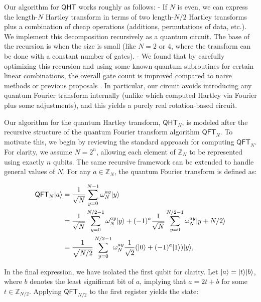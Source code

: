 \documentclass[12pt]{report}
\newcommand{\qht}{\mathsf{QHT}}
\newcommand{\qft}{\mathsf{QFT}}
\begin{document}
Our algorithm for $\qht$ works roughly as follows:
- If $N$ is even, we can express the length-$N$ Hartley transform in terms of two length-$N/2$ Hartley transforms plus a combination of cheap operations (additions, permutations of data, etc.). We implement this decomposition recursively as a quantum circuit. The base of the recursion is when the size is small (like $N=2$ or $4$, where the transform can be done with a constant number of gates).
- We found that by carefully optimizing this recursion and using some known quantum subroutines for certain linear combinations, the overall gate count is improved compared to naive methods or previous proposals \cite{Klappenecker2001DCT,Klappenecker2001Signal}. In particular, our circuit avoids introducing any quantum Fourier transform internally (unlike \cite{Klappenecker2001Signal} which computed Hartley via Fourier plus some adjustments), and this yields a purely real rotation-based circuit.



Our algorithm for the quantum Hartley transform, \( \qht_N \), is modeled after the recursive structure of the quantum Fourier transform algorithm \( \qft_N \). To motivate this, we begin by reviewing the standard approach for computing \( \qft_N \). For clarity, we assume \( N = 2^n \), allowing each element of \( \mathbb{Z}_N \) to be represented using exactly \( n \) qubits. The same recursive framework can be extended to handle general values of \( N \). For any \( a \in \mathbb{Z}_N \), the quantum Fourier transform is defined as:


\begin{align}
    \qft_N\ket{a}
    & = \frac{1}{\sqrt{N}} \sum_{y = 0}^{N - 1} \omega_N^{ay}\ket{y} \\
    & = \frac{1}{\sqrt{N}} \sum_{y = 0}^{N / 2 - 1} \omega_N^{ay} \ket{y} + (-1)^a \frac{1}{\sqrt{N}} \sum_{y = 0}^{N / 2 - 1} \omega_N^{ay} \ket{y + N/2} \\
    & = \frac{1}{\sqrt{N / 2}} \sum_{y = 0}^{N / 2 - 1} \omega_N^{ay} \frac{1}{\sqrt{2}} (\ket{0} + (-1)^a \ket{1}) \ket{y}, \label{eq:qft_alt}
\end{align}


In the final expression, we have isolated the first qubit for clarity. Let \( \lvert a\rangle = \lvert t\rangle\lvert b\rangle \), where \( b \) denotes the least significant bit of \( a \), implying that \( a = 2t + b \) for some \( t \in \mathbb{Z}_{N / 2} \). Applying \( \qft_{N / 2} \) to the first register yields the state:
\end{document}
